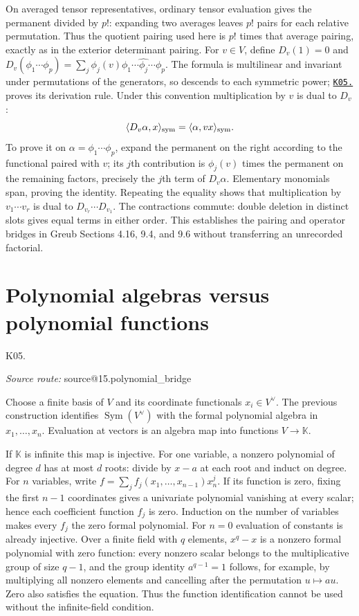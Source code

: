 \documentclass[11pt,a4paper]{book}
\makeatletter
\theoremstyle{definition}\newtheorem{definition}[theorem]{Definition}
\theoremstyle{remark}\newtheorem{remark}[theorem]{Remark}
\newcommand{\K}{\mathbb K}\newcommand{\R}{\mathbb R}\newcommand{\C}{\mathbb C}
\DeclareMathOperator{\Sym}{Sym}\DeclareMathOperator{\Ann}{Ann}
\newcommand{\kref}[1]{\hyperref[k:#1]{\texttt{K05.\detokenize{#1}}}}
\newcommand{\Kentry}[2]{\section{#2}\label{k:#1}\noindent\textsf{\small K05.\detokenize{#1}}\par
  \begingroup\small\color{black!65}\textit{Source route: }\csname source@#1\endcsname\par\endgroup}
\makeatother
\begin{document}
On averaged tensor representatives, ordinary tensor evaluation gives the permanent divided by $p!$: expanding two averages leaves $p!$ pairs for each relative permutation. Thus the quotient pairing used here is $p!$ times that average pairing, exactly as in the exterior determinant pairing. For $v\in V$, define $D_v(1)=0$ and
$D_v(\phi_1\cdots\phi_p)=\sum_j\phi_j(v)\phi_1\cdots\widehat{\phi_j}\cdots\phi_p$.
The formula is multilinear and invariant under permutations of the generators, so descends to each symmetric power; \kref{15.symmetric_derivation} proves its derivation rule. Under this convention multiplication by $v$ is dual to $D_v$:
\[
 \langle D_v\alpha,x\rangle_{\rm sym}=\langle\alpha,vx\rangle_{\rm sym}.
\]
To prove it on $\alpha=\phi_1\cdots\phi_p$, expand the permanent on the right according to the functional paired with $v$; its $j$th contribution is $\phi_j(v)$ times the permanent on the remaining factors, precisely the $j$th term of $D_v\alpha$. Elementary monomials span, proving the identity. Repeating the equality shows that multiplication by $v_1\cdots v_r$ is dual to $D_{v_r}\cdots D_{v_1}$. The contractions commute: double deletion in distinct slots gives equal terms in either order. This establishes the pairing and operator bridges in Greub Sections 4.16, 9.4, and 9.6 without transferring an unrecorded factorial.

\Kentry{15.polynomial_bridge}{Polynomial algebras versus polynomial functions}
Choose a finite basis of $V$ and its coordinate functionals $x_i\in V^\vee$. The previous construction identifies $\Sym(V^\vee)$ with the formal polynomial algebra in $x_1,\ldots,x_n$. Evaluation at vectors is an algebra map into functions $V\to\K$.

If $\K$ is infinite this map is injective. For one variable, a nonzero polynomial of degree $d$ has at most $d$ roots: divide by $x-a$ at each root and induct on degree. For $n$ variables, write $f=\sum_j f_j(x_1,\ldots,x_{n-1})x_n^j$. If its function is zero, fixing the first $n-1$ coordinates gives a univariate polynomial vanishing at every scalar; hence each coefficient function $f_j$ is zero. Induction on the number of variables makes every $f_j$ the zero formal polynomial. For $n=0$ evaluation of constants is already injective. Over a finite field with $q$ elements, $x^q-x$ is a nonzero formal polynomial with zero function: every nonzero scalar belongs to the multiplicative group of size $q-1$, and the group identity $a^{q-1}=1$ follows, for example, by multiplying all nonzero elements and cancelling after the permutation $u\mapsto au$. Zero also satisfies the equation. Thus the function identification cannot be used without the infinite-field condition.
\end{document}
